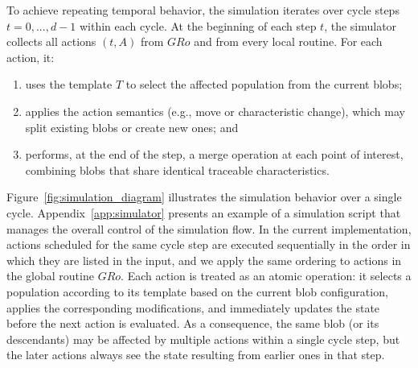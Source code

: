 \documentclass[pdflatex,sn-mathphys-num]{sn-jnl}%
\newcommand\redb[1]{#1}
\theoremstyle{thmstyleone}%
\theoremstyle{thmstyletwo}%
\theoremstyle{thmstylethree}%
\begin{document}

To achieve repeating temporal behavior, the simulation iterates over cycle steps $t = 0, ..., d-1$ within each cycle. At the beginning of each step 
$t$, the simulator collects all actions $(t,A)$ from $GRo$ and from every local routine. For each action, it:
\begin{enumerate}
    \item uses the template $T$ to select the affected population from the current blobs;
    \item applies the action semantics (e.g., move or characteristic change), which may split existing blobs or create new ones; and
    \item performs, at the end of the step, a merge operation at each point of interest, combining blobs that share identical traceable characteristics.
\end{enumerate}

Figure~\ref{fig:simulation_diagram} illustrates the simulation behavior over a single cycle. Appendix~\ref{app:simulator} presents an example of a simulation script that manages the overall control of the simulation flow. \redb{In the current implementation, actions scheduled for the same cycle step are executed sequentially in the order in which they are listed in the input, and we apply the same ordering to actions in the global routine $GRo$. 
Each action is treated as an atomic operation: it selects a population according to its template based on the current blob configuration, applies the corresponding modifications, and immediately updates the state before the next action is evaluated. As a consequence, the same blob (or its descendants) may be affected by multiple actions within a single cycle step, but the later actions always see the state resulting from earlier ones in that step.}
\end{document}
